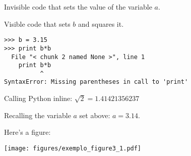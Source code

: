 \documentclass{article}
\begin{document}
Invisible code that sets the value of the variable $a$.




Visible code that sets $b$ and squares it.


\begin{verbatim}
>>> b = 3.15
>>> print b*b
  File "< chunk 2 named None >", line 1
    print b*b
          ^
SyntaxError: Missing parentheses in call to 'print'

\end{verbatim}


Calling Python inline: $\sqrt{2} = 1.41421356237$

Recalling the variable $a$ set above: $a = 3.14$.

Here's a figure:


\texttt{[image: figures/exemplo\_figure3\_1.pdf]}
\end{document}
